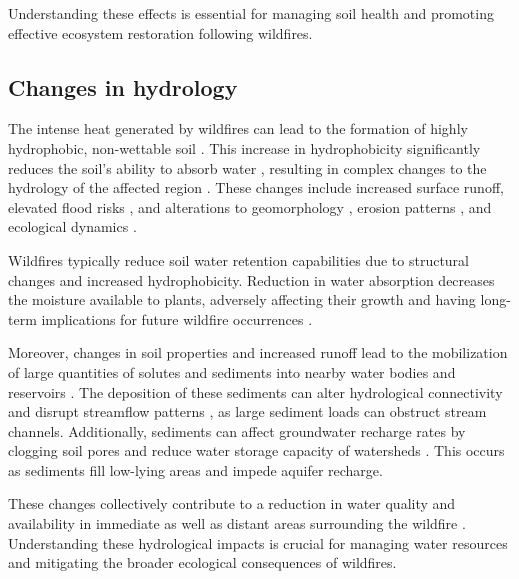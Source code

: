 \documentclass[
  12 pt,
]{Nemilov}
\begin{document}
Understanding these effects is essential for managing soil health and promoting effective ecosystem restoration following wildfires.

\subsection{Changes in hydrology}\label{changes-in-hydrology}

The intense heat generated by wildfires can lead to the formation of highly hydrophobic, non-wettable soil \citep{chen2020soil, debano1966water, varela2005impact, woods2007spatial}. This increase in hydrophobicity significantly reduces the soil's ability to absorb water \citep{jimenez2017wildfire}, resulting in complex changes to the hydrology of the affected region \citep{doerr2006effects}. These changes include increased surface runoff, elevated flood risks \citep{moody2008linking, prosser1998effect}, and alterations to geomorphology \citep{moody2001initial, shakesby2006wildfire}, erosion patterns \citep{huffman2001strength, shakesby2011post}, and ecological dynamics \citep{kinnaird1998ecological}.

Wildfires typically reduce soil water retention capabilities \citep{ebel2012wildfire} due to structural changes and increased hydrophobicity. Reduction in water absorption decreases the moisture available to plants, adversely affecting their growth and having long-term implications for future wildfire occurrences \citep{hou2020observational, jensen2018sensitivity, krueger2022using}.

Moreover, changes in soil properties and increased runoff lead to the mobilization of large quantities of solutes and sediments into nearby water bodies and reservoirs \citep{moody2004wildfire, warrick2007suspended}. The deposition of these sediments can alter hydrological connectivity \citep{ortiz2019changes, wu2021comparing} and disrupt streamflow patterns \citep{gao2012trends, guo2023does, khaledi2022wildfire}, as large sediment loads can obstruct stream channels. Additionally, sediments can affect groundwater recharge rates by clogging soil pores \citep{rey2023wildfire} and reduce water storage capacity of watersheds \citep{hallema2018reframing, nyman2014modeling}. This occurs as sediments fill low-lying areas and impede aquifer recharge.

These changes collectively contribute to a reduction in water quality and availability in immediate as well as distant areas surrounding the wildfire \citep{emmerton2020severe, rhoades2019influence, smith2011wildfire}. Understanding these hydrological impacts is crucial for managing water resources and mitigating the broader ecological consequences of wildfires.
\end{document}
